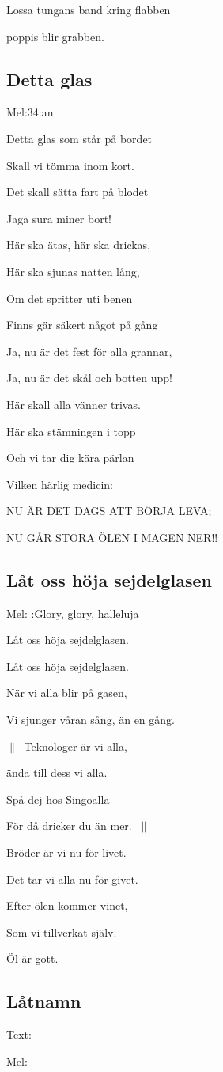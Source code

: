 Lossa tungans band kring flabben

poppis blir grabben. 

\subsection{\textbf{Detta glas}}

Mel:34:an \bigskip

Detta glas som står på bordet

Skall vi tömma inom kort.

Det skall sätta fart på blodet

Jaga sura miner bort!\bigskip

Här ska ätas, här ska drickas,

Här ska sjunas natten lång,

Om det spritter uti benen

Finns gär säkert något på gång\bigskip

Ja, nu är det fest för alla grannar,

Ja, nu är det skål och botten upp!

Här skall alla vänner trivas.

Här ska stämningen i topp

Och vi tar dig kära pärlan

Vilken härlig medicin:

NU ÄR DET DAGS ATT BÖRJA LEVA;

NU GÅR STORA ÖLEN I MAGEN NER!!

\subsection{\textbf{Låt oss höja sejdelglasen}}

Mel: :Glory, glory, halleluja \bigskip


Låt oss höja sejdelglasen.

Låt oss höja sejdelglasen.

När vi alla blir på gasen,

Vi sjunger våran sång, än en gång.\bigskip

$\|\:$ Teknologer är vi alla,

ända till dess vi alla.

Spå dej hos Singoalla

För då dricker du än mer. $\:\|$\bigskip

Bröder är vi nu för livet.

Det tar vi alla nu för givet.

Efter ölen kommer vinet,

Som vi tillverkat själv.

Öl är gott. 

\subsection{\textbf{Låtnamn}}

Text: 

Mel: \bigskip

\newpage